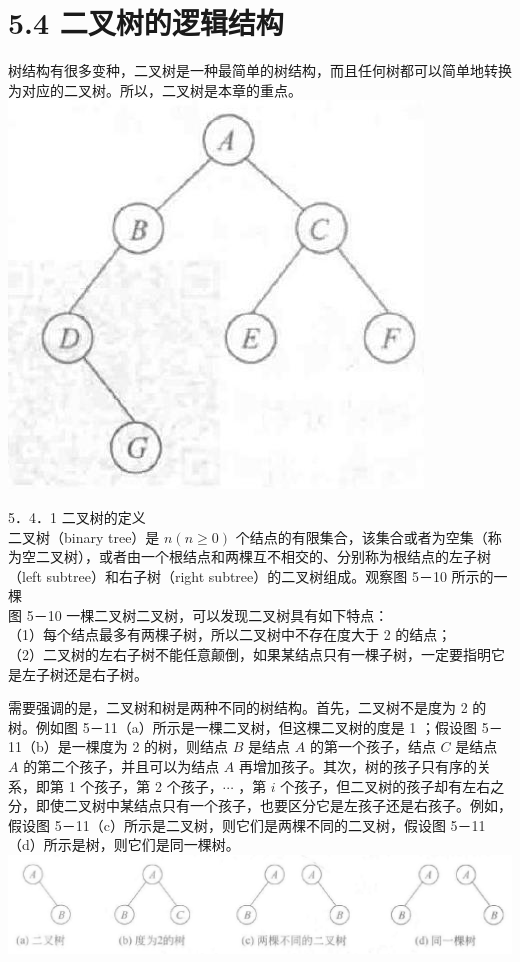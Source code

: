 \documentclass[10pt]{article}
\begin{document}
\section*{5.4 二叉树的逻辑结构}
树结构有很多变种，二叉树是一种最简单的树结构，而且任何树都可以简单地转换为对应的二叉树。所以，二叉树是本章的重点。\\
\includegraphics[max width=\textwidth, center]{2025_06_06_704745ea57b15b2333e5g-147}

5．4．1 二叉树的定义\\
二叉树（binary tree）是 $n(n \geqslant 0)$ 个结点的有限集合，该集合或者为空集（称为空二叉树），或者由一个根结点和两棵互不相交的、分别称为根结点的左子树（left subtree）和右子树（right subtree）的二叉树组成。观察图 5－10 所示的一棵\\
图 5－10 一棵二叉树二叉树，可以发现二叉树具有如下特点：\\
（1）每个结点最多有两棵子树，所以二叉树中不存在度大于 2 的结点；\\
（2）二叉树的左右子树不能任意颠倒，如果某结点只有一棵子树，一定要指明它是左子树还是右子树。

需要强调的是，二叉树和树是两种不同的树结构。首先，二叉树不是度为 2 的树。例如图 5－11（a）所示是一棵二叉树，但这棵二叉树的度是 1 ；假设图 5－11（b）是一棵度为 2 的树，则结点 $B$ 是结点 $A$ 的第一个孩子，结点 $C$ 是结点 $A$ 的第二个孩子，并且可以为结点 $A$ 再增加孩子。其次，树的孩子只有序的关系，即第 1 个孩子，第 2 个孩子，$\cdots$ ，第 $i$ 个孩子，但二叉树的孩子却有左右之分，即使二叉树中某结点只有一个孩子，也要区分它是左孩子还是右孩子。例如，假设图 5－11（c）所示是二叉树，则它们是两棵不同的二叉树，假设图 5－11（d）所示是树，则它们是同一棵树。\\
\includegraphics[max width=\textwidth, center]{2025_06_06_704745ea57b15b2333e5g-148(1)}
\end{document}
